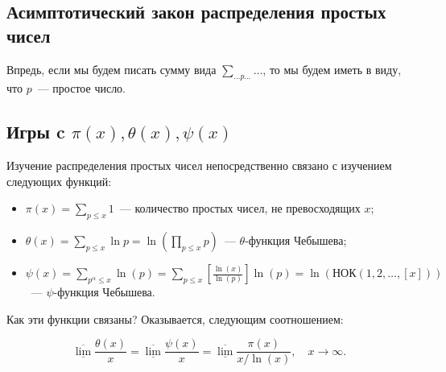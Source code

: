 \begin{center}
	\section{Асимптотический закон распределения простых чисел}
\end{center}
\begin{note}
	Впредь, если мы будем писать сумму вида $\displaystyle \sum_{ \ldots p \ldots} \ldots$, то мы будем иметь в виду, что $p$ — простое число.
\end{note}

\subsection{Игры c $\pi(x), \theta(x), \psi(x)$}
Изучение распределения простых чисел непосредственно связано с изучением следующих функций:
\begin{itemize}[nolistsep]
   \item $\displaystyle \pi(x) = \sum_{p \leq x} 1$ — количество простых чисел, не превосходящих $x$;
   \item $\displaystyle \theta(x) = \sum_{p \leq x} \ln p = \ln \left(\prod_{p \leq x} p\right)$ — $\theta$-функция Чебышева;
   \item $\displaystyle \psi(x) = \sum_{p^{\alpha} \leq x} \ln(p) = \sum_{p \leq x} \left[\frac{\ln(x)}{\ln(p)}\right] \ln(p) = \ln \left( \text{НОК}(1, 2, \ldots, [x]) \right)$ — $\psi$-функция Чебышева.
\end{itemize}
Как эти функции связаны? Оказывается, следующим соотношением:
\begin{lemma} \label{l1_lm1}
	$$\underline{\overline{\lim}} \frac{\theta(x)}{x} = \underline{\overline{\lim}} \frac{\psi(x)}{x} = \underline{\overline{\lim}} \frac{\pi(x)}{x / \ln(x)}, \quad x \to \infty.$$
\end{lemma}
